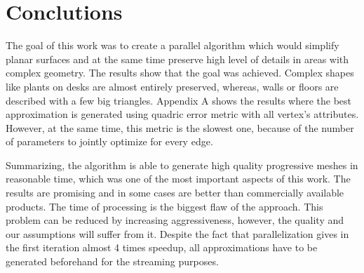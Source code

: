 \chapter{Conclutions}
\thispagestyle{empty}%

The goal of this work was to create a parallel algorithm which would simplify planar surfaces and at the same time preserve high level of details in areas with complex geometry. The results show that the goal was achieved. Complex shapes like plants on desks are almost entirely preserved, whereas, walls or floors are described with a few big triangles. Appendix A shows the results where the best approximation is generated using quadric error metric with all vertex's attributes. However, at the same time, this metric is the slowest one, because of the number of parameters to jointly optimize for every edge.

Summarizing, the algorithm is able to generate high quality progressive meshes in reasonable time, which was one of the most important aspects of this work. The results are promising and in some cases are better than commercially available products. The time of processing is the biggest flaw of the approach. This problem can be reduced by increasing aggressiveness, however, the quality and our assumptions will suffer from it. Despite the fact that parallelization gives in the first iteration almost 4 times speedup, all approximations have to be generated beforehand for the streaming purposes.
